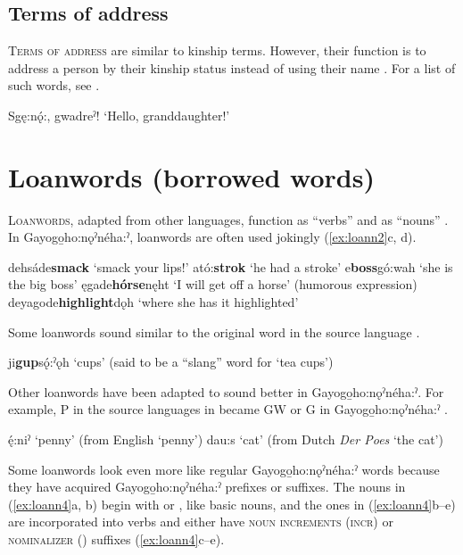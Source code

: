 \subsection{Terms of address} \label{ch:Terms of address}
\textsc{Terms of address} are similar to kinship terms. However, their function is to address a person by their kinship status instead of using their name . For a list of such words, see .

\ea\label{ex:kinn300} Sgę:nǫ́:, gwadreˀ! ‘Hello, granddaughter!’ 
\z


\section{Loanwords (borrowed words)} \label{ch:Loanwords (borrowed words)}
\textsc{Loanwords}, adapted from other languages, function as “verbs”  and as “nouns” . In Gayogo̱ho:nǫˀnéha:ˀ, loanwords are often used jokingly (\ref{ex:loann2}c, d).

\ea\label{ex:loann2}
\ea dehsáde\textbf{smack} ‘smack your lips!’
\ex ató:\textbf{strok} ‘he had a stroke’
\ex e\textbf{boss}gó:wah ‘she is the big boss’
\ex ęgade\textbf{hórse}nęht ‘I will get off a horse’ (humorous expression)
\ex deyagode\textbf{highlight}dǫh ‘where she has it highlighted’
\z
\z


Some loanwords sound similar to the original word in the source language . 

\ea\label{ex:loann} ji\textbf{gup}sǫ́:ˀǫh ‘cups’ (said to be a “slang” word for ‘tea cups’)
\z

Other loanwords have been adapted to sound better in Gayogo̱ho:nǫˀnéha:ˀ. For example, P in the source languages in  became GW or G in Gayogo̱ho:nǫˀnéha:ˀ .

\ea\label{ex:loann3}
\ea {}ę́:niˀ ‘penny’ (from English ‘penny’)
\ex dau:s ‘cat’ (from Dutch \textit{Der Poes} ‘the cat’)
\z
\z

Some loanwords look even more like regular Gayogo̱ho:nǫˀnéha:ˀ words because they have acquired Gayogo̱ho:nǫˀnéha:ˀ prefixes or suffixes. The nouns in (\ref{ex:loann4}a, b) begin with  or , like basic nouns, and the ones in (\ref{ex:loann4}b--e) are incorporated into verbs and either have \textsc{noun increments} (\textsc{incr})  or \textsc{nominalizer} (\nominalizer) suffixes (\ref{ex:loann4}c--e).


